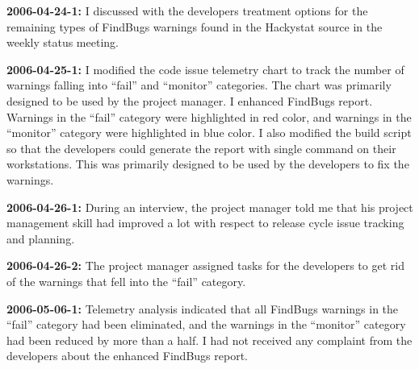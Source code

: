\textbf{2006-04-24-1:}
I discussed with the developers treatment options for the remaining types of FindBugs warnings found in the Hackystat source in the weekly status meeting.

\textbf{2006-04-25-1:}
I modified the code issue telemetry chart to track the number of warnings falling into ``fail'' and ``monitor'' categories. The chart was primarily designed to be used by the project manager.
I enhanced FindBugs report. Warnings in the ``fail'' category were highlighted in red color, and warnings in the ``monitor'' category were highlighted in blue color. I also modified the build script so that the developers could generate the report with single command on their workstations. This was primarily designed to be used by the developers to fix the warnings.

\textbf{2006-04-26-1:}
During an interview, the project manager told me that his project management skill had improved a lot with respect to release cycle issue tracking and planning.

\textbf{2006-04-26-2:}
The project manager assigned tasks for the developers to get rid of the warnings that fell into the ``fail'' category.

\textbf{2006-05-06-1:}
Telemetry analysis indicated that all FindBugs warnings in the ``fail'' category had been eliminated, and the warnings in the ``monitor'' category had been reduced by more than a half. I had not received any complaint from the developers about the enhanced FindBugs report.



\setlength{\parindent}{6mm} %
\setlength{\parskip}{3mm}   %
  
